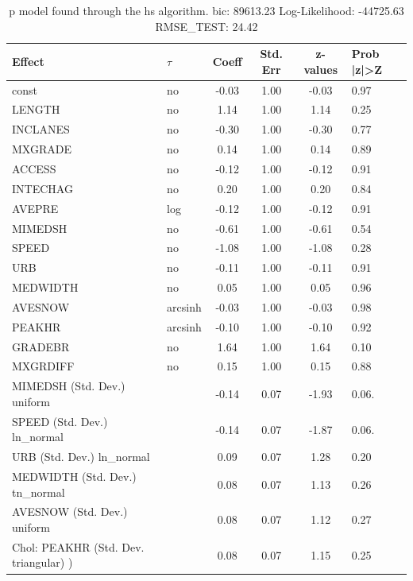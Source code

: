 \begin{table}
	\caption{p model found through the hs algorithm. bic: 89613.23 Log-Likelihood: -44725.63 RMSE_TEST: 24.42}
	\begin{center}
		\begin{tabular}{|l|l|c|c|c|l|}
			\hline
			Effect & $\tau$ & Coeff & Std. Err & z-values & Prob |z|>Z \\
			\hline
			const & no & -0.03 & 1.00 & -0.03 & 0.97 \\
			\hline
			LENGTH & no & 1.14 & 1.00 & 1.14 & 0.25 \\
			\hline
			INCLANES & no & -0.30 & 1.00 & -0.30 & 0.77 \\
			\hline
			MXGRADE & no & 0.14 & 1.00 & 0.14 & 0.89 \\
			\hline
			ACCESS & no & -0.12 & 1.00 & -0.12 & 0.91 \\
			\hline
			INTECHAG & no & 0.20 & 1.00 & 0.20 & 0.84 \\
			\hline
			AVEPRE & log & -0.12 & 1.00 & -0.12 & 0.91 \\
			\hline
			MIMEDSH & no & -0.61 & 1.00 & -0.61 & 0.54 \\
			\hline
			SPEED & no & -1.08 & 1.00 & -1.08 & 0.28 \\
			\hline
			URB & no & -0.11 & 1.00 & -0.11 & 0.91 \\
			\hline
			MEDWIDTH & no & 0.05 & 1.00 & 0.05 & 0.96 \\
			\hline
			AVESNOW & arcsinh & -0.03 & 1.00 & -0.03 & 0.98 \\
			\hline
			PEAKHR & arcsinh & -0.10 & 1.00 & -0.10 & 0.92 \\
			\hline
			GRADEBR & no & 1.64 & 1.00 & 1.64 & 0.10 \\
			\hline
			MXGRDIFF & no & 0.15 & 1.00 & 0.15 & 0.88 \\
			\hline
			MIMEDSH (Std. Dev.) uniform &  & -0.14 & 0.07 & -1.93 & 0.06. \\
			\hline
			SPEED (Std. Dev.) ln_normal &  & -0.14 & 0.07 & -1.87 & 0.06. \\
			\hline
			URB (Std. Dev.) ln_normal &  & 0.09 & 0.07 & 1.28 & 0.20 \\
			\hline
			MEDWIDTH (Std. Dev.) tn_normal &  & 0.08 & 0.07 & 1.13 & 0.26 \\
			\hline
			AVESNOW (Std. Dev.) uniform &  & 0.08 & 0.07 & 1.12 & 0.27 \\
			\hline
			 Chol: PEAKHR (Std. Dev. triangular) ) &  & 0.08 & 0.07 & 1.15 & 0.25 \\
			\hline

\end{tabular}
\end{center}
\end{table}
